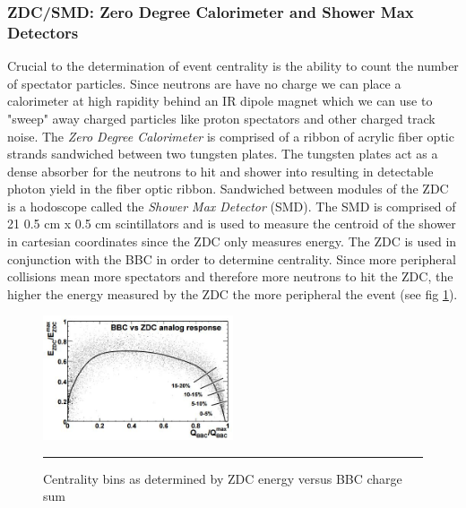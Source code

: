 \subsubsection{ZDC/SMD: Zero Degree Calorimeter and Shower Max Detectors}


Crucial to the determination of event centrality is the ability to count the number of spectator particles. Since neutrons are have no charge we can place a calorimeter at high rapidity behind an IR dipole magnet which we can use to "sweep" away charged particles like proton spectators and other charged track noise. The \textit{Zero Degree Calorimeter}\citep{ZDCfocus} is comprised of a ribbon of acrylic fiber optic strands sandwiched between two tungsten plates. The tungsten plates act as a dense absorber for the neutrons to hit and shower into resulting in detectable photon yield in the fiber optic ribbon. Sandwiched between modules of the ZDC is a hodoscope called the \textit{Shower Max Detector} (SMD). The SMD is comprised of 21 0.5 cm x 0.5 cm scintillators and is used to measure the centroid of the shower in cartesian coordinates since the ZDC only measures energy\citep{phenixzdc}. The ZDC is used in conjunction with the BBC in order to determine centrality. Since more peripheral collisions mean more spectators and therefore more neutrons to hit the ZDC, the higher the energy measured by the ZDC the more peripheral the event (see fig \ref{fig:zdcvsbbc}\citep{Ghosh2001}).

\begin{figure}[h!]
  \centering
    \includegraphics[width=0.5\textwidth]{prevplots/bbczdcanaresponse.JPG}
    \rule{35em}{0.5pt}
  \caption[Centrality bins as determined by ZDC energy versus BBC charge sum]{Centrality bins as determined by ZDC energy versus BBC charge sum\citep{Ghosh2001}}
  \label{fig:zdcvsbbc}
\end{figure}

